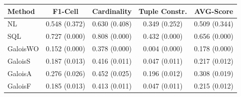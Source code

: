 \begin{tabular}{lcccc}
\toprule
Method & F1-Cell & Cardinality & Tuple Constr. & AVG-Score \\
\midrule
NL & 0.548 (0.372) & 0.630 (0.408) & 0.349 (0.252) & 0.509 (0.344) \\
SQL & 0.727 (0.000) & 0.808 (0.000) & 0.432 (0.000) & 0.656 (0.000) \\
GaloisWO & 0.152 (0.000) & 0.378 (0.000) & 0.004 (0.000) & 0.178 (0.000) \\
GaloisS & 0.187 (0.013) & 0.416 (0.011) & 0.047 (0.011) & 0.217 (0.012) \\
GaloisA & 0.276 (0.026) & 0.452 (0.025) & 0.196 (0.012) & 0.308 (0.019) \\
GaloisF & 0.185 (0.013) & 0.413 (0.011) & 0.047 (0.011) & 0.215 (0.012) \\
\bottomrule
\end{tabular}